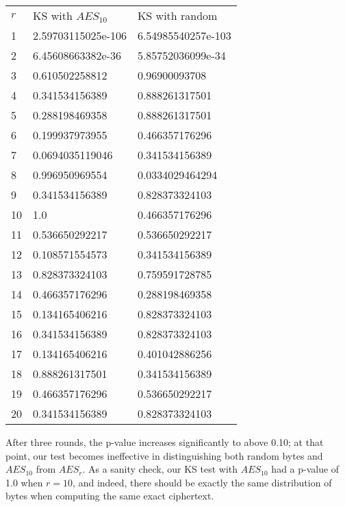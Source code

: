 \documentclass[11pt]{article}
\begin{document}
\begin{table}[h]
		\centering
		\begin{tabular}{lll}
				\rowcolor[HTML]{EFEFEF} 
				$r$  & KS with $AES_{10}$      & KS with random     \\
				1  & 2.59703115025e-106 & 6.54985540257e-103 \\
				2  & 6.45608663382e-36  & 5.85752036099e-34  \\
				3  & 0.610502258812     & 0.96900093708      \\
				4  & 0.341534156389     & 0.888261317501     \\
				5  & 0.288198469358     & 0.888261317501     \\
				6  & 0.199937973955     & 0.466357176296     \\
				7  & 0.0694035119046    & 0.341534156389     \\
				8  & 0.996950969554     & 0.0334029464294    \\
				9  & 0.341534156389     & 0.828373324103     \\
				10 & 1.0                & 0.466357176296     \\
				11 & 0.536650292217     & 0.536650292217     \\
				12 & 0.108571554573     & 0.341534156389     \\
				13 & 0.828373324103     & 0.759591728785     \\
				14 & 0.466357176296     & 0.288198469358     \\
				15 & 0.134165406216     & 0.828373324103     \\
				16 & 0.341534156389     & 0.828373324103     \\
				17 & 0.134165406216     & 0.401042886256     \\
				18 & 0.888261317501     & 0.341534156389     \\
				19 & 0.466357176296     & 0.536650292217     \\
				20 & 0.341534156389     & 0.828373324103    
		\end{tabular}
\end{table}

After three rounds, the p-value increases significantly to above 0.10; at that point, our test becomes ineffective in distinguishing both random bytes and $AES_{10}$ from $AES_{r}$. As a sanity check, our KS test with $AES_{10}$ had a p-value of 1.0 when $r=10$, and indeed, there should be exactly the same distribution of bytes when computing the same exact ciphertext.
\end{document}

